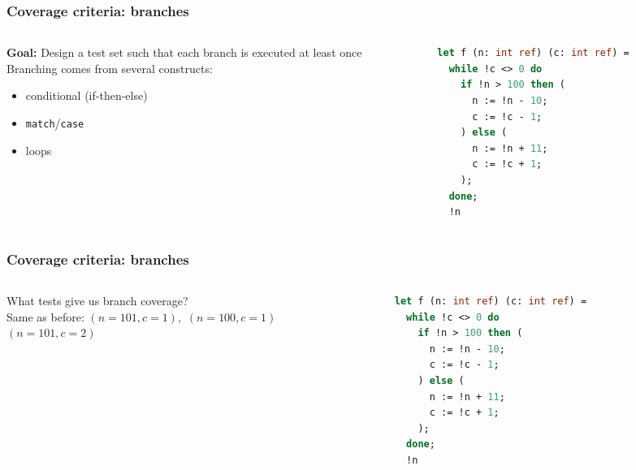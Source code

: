 \documentclass[10pt,xcolor={dvipsnames}]{beamer}
\begin{document}
\begin{frame}[fragile]

\frametitle{Coverage criteria: branches}

\begin{columns}
\begin{column}{0.45\textwidth}
\textbf{Goal:} Design a test set such that each branch is executed at least once
\\[1em]

\pause
Branching comes from several constructs:
\begin{itemize}
\pause\item conditional (if-then-else)
\item \texttt{match}/\texttt{case}
\item loops
\end{itemize}
\end{column}

\begin{column}{0.55\textwidth}
\begin{lstlisting}[language=Caml]
let f (n: int ref) (c: int ref) =   
  while !c <> 0 do
    if !n > 100 then (
      n := !n - 10;
      c := !c - 1;
    ) else (
      n := !n + 11;
      c := !c + 1;
    );    
  done;
  !n
\end{lstlisting}
\end{column}

\end{columns}

\end{frame}


\begin{frame}[fragile]

\frametitle{Coverage criteria: branches}

\begin{columns}
\begin{column}{0.45\textwidth}
What tests give us branch coverage?
\\[1em]

\pause
Same as before:
$(n = 101, c = 1),$
$(n = 100, c = 1)$
\\

$(n = 101, c = 2)$
\end{column}

\begin{column}{0.55\textwidth}
\begin{lstlisting}[language=Caml]
let f (n: int ref) (c: int ref) =   
  while !c <> 0 do
    if !n > 100 then (
      n := !n - 10;
      c := !c - 1;
    ) else (
      n := !n + 11;
      c := !c + 1;
    );    
  done;
  !n
\end{lstlisting}
\end{column}

\end{columns}

\end{frame}
\end{document}
